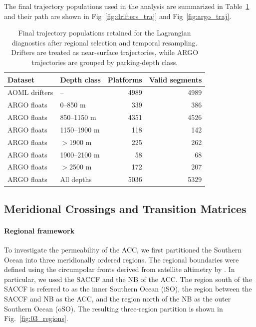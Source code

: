 \documentclass[
  draft
]{agujournal2025}
\begin{document}
        The final trajectory populations used in the analysis are summarized in Table~\ref{tab:lagrangian_dataset_population} and their path are shown in Fig~\ref{fig:drifters_traj} and Fig~\ref{fig:argo_traj}.
        
        \begin{table}[t]
            \centering
            \small
            \begin{tabular}{llrr}
                \hline
                Dataset       & Depth class  & Platforms & Valid segments \\
                \hline
                AOML drifters & --           & 4989 & 4989 \\
                ARGO floats   & 0--850 m     &  339 &  386 \\
                ARGO floats   & 850--1150 m  & 4351 & 4526 \\
                ARGO floats   & 1150--1900 m &  118 &  142 \\
                ARGO floats   & $>$1900 m    &  225 &  262 \\
                ARGO floats   & 1900--2100 m &   58 &   68 \\
                ARGO floats   & $>$2500 m    &  172 &  207 \\
                \hline
                ARGO floats   & All depths   & 5036 & 5329 \\
                \hline
            \end{tabular}
            \caption{Final trajectory populations retained for the Lagrangian diagnostics after regional selection and temporal resampling. Drifters are treated as near-surface trajectories, while ARGO trajectories are grouped by parking-depth class.} \label{tab:lagrangian_dataset_population}
        \end{table}
 
    \subsection{Meridional Crossings and Transition Matrices}
        \label{sec:crossings_transition_matrix}

        \paragraph{Regional framework}
            To investigate the permeability of the ACC, we first partitioned the Southern Ocean into three meridionally ordered regions. The regional boundaries were defined using the circumpolar fronts derived from satellite altimetry by \cite{data:park2019}. In particular, we used the SACCF and the NB of the ACC. The region south of the SACCF is referred to as the inner Southern Ocean (iSO), the region between the SACCF and NB as the ACC, and the region north of the NB as the outer Southern Ocean (oSO). The resulting three-region partition is shown in Fig.~\ref{fig:03_regions}.
\end{document}

